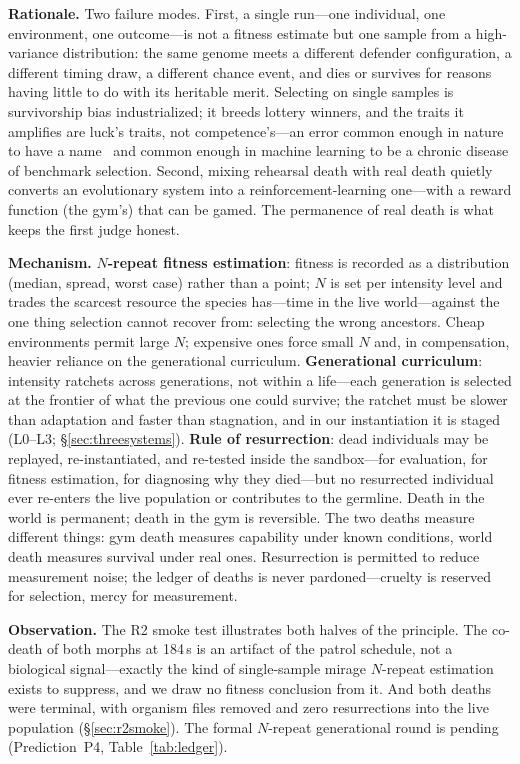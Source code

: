 \documentclass[11pt,a4paper]{article}
\begin{document}
\noindent\textbf{Rationale.} Two failure modes. First, a single run---one individual, one environment, one outcome---is not a fitness estimate but one sample from a high-variance distribution: the same genome meets a different defender configuration, a different timing draw, a different chance event, and dies or survives for reasons having little to do with its heritable merit. Selecting on single samples is survivorship bias industrialized; it breeds lottery winners, and the traits it amplifies are luck's traits, not competence's---an error common enough in nature to have a name~\cite{endler1986natural} and common enough in machine learning to be a chronic disease of benchmark selection. Second, mixing rehearsal death with real death quietly converts an evolutionary system into a reinforcement-learning one---with a reward function (the gym's) that can be gamed. The permanence of real death is what keeps the first judge honest.

\noindent\textbf{Mechanism.} \textbf{$N$-repeat fitness estimation}: fitness is recorded as a distribution (median, spread, worst case) rather than a point; $N$ is set per intensity level and trades the scarcest resource the species has---time in the live world---against the one thing selection cannot recover from: selecting the wrong ancestors. Cheap environments permit large $N$; expensive ones force small $N$ and, in compensation, heavier reliance on the generational curriculum. \textbf{Generational curriculum}: intensity ratchets across generations, not within a life---each generation is selected at the frontier of what the previous one could survive; the ratchet must be slower than adaptation and faster than stagnation, and in our instantiation it is staged (L0--L3; \S\ref{sec:threesystems}). \textbf{Rule of resurrection}: dead individuals may be replayed, re-instantiated, and re-tested inside the sandbox---for evaluation, for fitness estimation, for diagnosing why they died---but no resurrected individual ever re-enters the live population or contributes to the germline. Death in the world is permanent; death in the gym is reversible. The two deaths measure different things: gym death measures capability under known conditions, world death measures survival under real ones. Resurrection is permitted to reduce measurement noise; the ledger of deaths is never pardoned---cruelty is reserved for selection, mercy for measurement.

\noindent\textbf{Observation.} The R2 smoke test illustrates both halves of the principle. The co-death of both morphs at 184\,s is an artifact of the patrol schedule, not a biological signal---exactly the kind of single-sample mirage $N$-repeat estimation exists to suppress, and we draw no fitness conclusion from it. And both deaths were terminal, with organism files removed and zero resurrections into the live population (\S\ref{sec:r2smoke}). The formal $N$-repeat generational round is pending (Prediction~P4, Table~\ref{tab:ledger}).
\end{document}
